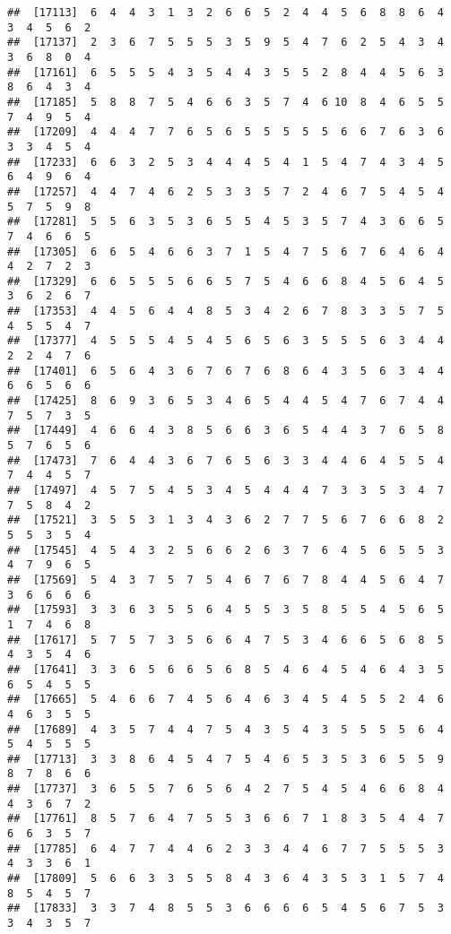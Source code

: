 \documentclass[
]{book}
\begin{document}
\begin{verbatim}
##  [17113]  6  4  4  3  1  3  2  6  6  5  2  4  4  5  6  8  8  6  4  3  4  5  6  2
##  [17137]  2  3  6  7  5  5  5  3  5  9  5  4  7  6  2  5  4  3  4  3  6  8  0  4
##  [17161]  6  5  5  5  4  3  5  4  4  3  5  5  2  8  4  4  5  6  3  8  6  4  3  4
##  [17185]  5  8  8  7  5  4  6  6  3  5  7  4  6 10  8  4  6  5  5  7  4  9  5  4
##  [17209]  4  4  4  7  7  6  5  6  5  5  5  5  5  6  6  7  6  3  6  3  3  4  5  4
##  [17233]  6  6  3  2  5  3  4  4  4  5  4  1  5  4  7  4  3  4  5  6  4  9  6  4
##  [17257]  4  4  7  4  6  2  5  3  3  5  7  2  4  6  7  5  4  5  4  5  7  5  9  8
##  [17281]  5  5  6  3  5  3  6  5  5  4  5  3  5  7  4  3  6  6  5  7  4  6  6  5
##  [17305]  6  6  5  4  6  6  3  7  1  5  4  7  5  6  7  6  4  6  4  4  2  7  2  3
##  [17329]  6  6  5  5  5  6  6  5  7  5  4  6  6  8  4  5  6  4  5  3  6  2  6  7
##  [17353]  4  4  5  6  4  4  8  5  3  4  2  6  7  8  3  3  5  7  5  4  5  5  4  7
##  [17377]  4  5  5  5  4  5  4  5  6  5  6  3  5  5  5  6  3  4  4  2  2  4  7  6
##  [17401]  6  5  6  4  3  6  7  6  7  6  8  6  4  3  5  6  3  4  4  6  6  5  6  6
##  [17425]  8  6  9  3  6  5  3  4  6  5  4  4  5  4  7  6  7  4  4  7  5  7  3  5
##  [17449]  4  6  6  4  3  8  5  6  6  3  6  5  4  4  3  7  6  5  8  5  7  6  5  6
##  [17473]  7  6  4  4  3  6  7  6  5  6  3  3  4  4  6  4  5  5  4  7  4  4  5  7
##  [17497]  4  5  7  5  4  5  3  4  5  4  4  4  7  3  3  5  3  4  7  7  5  8  4  2
##  [17521]  3  5  5  3  1  3  4  3  6  2  7  7  5  6  7  6  6  8  2  5  5  3  5  4
##  [17545]  4  5  4  3  2  5  6  6  2  6  3  7  6  4  5  6  5  5  3  4  7  9  6  5
##  [17569]  5  4  3  7  5  7  5  4  6  7  6  7  8  4  4  5  6  4  7  3  6  6  6  6
##  [17593]  3  3  6  3  5  5  6  4  5  5  3  5  8  5  5  4  5  6  5  1  7  4  6  8
##  [17617]  5  7  5  7  3  5  6  6  4  7  5  3  4  6  6  5  6  8  5  4  3  5  4  6
##  [17641]  3  3  6  5  6  6  5  6  8  5  4  6  4  5  4  6  4  3  5  6  5  4  5  5
##  [17665]  5  4  6  6  7  4  5  6  4  6  3  4  5  4  5  5  2  4  6  4  6  3  5  5
##  [17689]  4  3  5  7  4  4  7  5  4  3  5  4  3  5  5  5  5  6  4  5  4  5  5  5
##  [17713]  3  3  8  6  4  5  4  7  5  4  6  5  3  5  3  6  5  5  9  8  7  8  6  6
##  [17737]  3  6  5  5  7  6  5  6  4  2  7  5  4  5  4  6  6  8  4  4  3  6  7  2
##  [17761]  8  5  7  6  4  7  5  5  3  6  6  7  1  8  3  5  4  4  7  6  6  3  5  7
##  [17785]  6  4  7  7  4  4  6  2  3  3  4  4  6  7  7  5  5  5  3  4  3  3  6  1
##  [17809]  5  6  6  3  3  5  5  8  4  3  6  4  3  5  3  1  5  7  4  8  5  4  5  7
##  [17833]  3  3  7  4  8  5  5  3  6  6  6  6  5  4  5  6  7  5  3  3  4  3  5  7

\end{verbatim}
\end{document}
